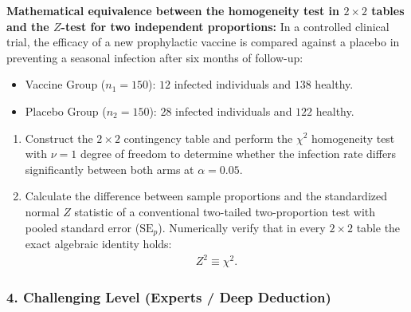 \begin{problema}
	\label{prob:chi-analit-homogeneidad-z}
	\textbf{Mathematical equivalence between the homogeneity test in $2 \times 2$ tables and the $Z$-test for two independent proportions:}
	In a controlled clinical trial, the efficacy of a new prophylactic vaccine is compared against a placebo in preventing a seasonal infection after six months of follow-up:
	\begin{itemize}
		\item Vaccine Group ($n_1 = 150$): $12$ infected individuals and $138$ healthy.
		\item Placebo Group ($n_2 = 150$): $28$ infected individuals and $122$ healthy.
	\end{itemize}
	\begin{enumerate}
		\item Construct the $2 \times 2$ contingency table and perform the $\chi^2$ homogeneity test with $\nu = 1$ degree of freedom to determine whether the infection rate differs significantly between both arms at $\alpha = 0.05$.
		\item Calculate the difference between sample proportions and the standardized normal $Z$ statistic of a conventional two-tailed two-proportion test with pooled standard error ($\text{SE}_p$). Numerically verify that in every $2 \times 2$ table the exact algebraic identity holds:
		\begin{align}
			Z^2 \equiv \chi^2.
		\end{align}
	\end{enumerate}
\end{problema}

\subsubsection*{4. Challenging Level (Experts / Deep Deduction)}


